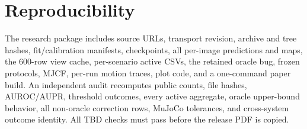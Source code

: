\documentclass[journal]{IEEEtran}
\newcommand{\AuditChecks}{TBD}
\begin{document}
\section{Reproducibility}

The research package includes source URLs, transport revision, archive and tree
hashes, fit/calibration manifests, checkpoints, all per-image predictions and
maps, the 600-row view cache, per-scenario active CSVs, the retained oracle bug,
frozen protocols, MJCF, per-run motion traces, plot code, and a one-command paper
build.  An independent audit recomputes public counts, file hashes, AUROC/AUPR,
threshold outcomes, every active aggregate, oracle upper-bound behavior, all
non-oracle correction rows, MuJoCo tolerances, and cross-system outcome identity.
All \AuditChecks{} checks must pass before the release PDF is copied.

\balance


\end{document}
